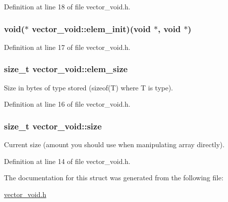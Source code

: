 \-Definition at line 18 of file vector\-\_\-void.\-h.

\hypertarget{structvector__void_af5d27d7e1af89d5dfbcf49f1810cc0c2}{
\subsubsection[{elem\-\_\-init}]{\setlength{\rightskip}{0pt plus 5cm}void($\ast$ {\bf vector\-\_\-void\-::elem\-\_\-init})(void $\ast$, void $\ast$)}}\label{structvector__void_af5d27d7e1af89d5dfbcf49f1810cc0c2}


\-Definition at line 17 of file vector\-\_\-void.\-h.

\hypertarget{structvector__void_afedda26ce85492462b79dae9090c49f6}{
\subsubsection[{elem\-\_\-size}]{\setlength{\rightskip}{0pt plus 5cm}size\-\_\-t {\bf vector\-\_\-void\-::elem\-\_\-size}}}\label{structvector__void_afedda26ce85492462b79dae9090c49f6}


\-Size in bytes of type stored (sizeof(\-T) where \-T is type). 



\-Definition at line 16 of file vector\-\_\-void.\-h.

\hypertarget{structvector__void_a94e09482f6122993461724a988ae6f92}{
\subsubsection[{size}]{\setlength{\rightskip}{0pt plus 5cm}size\-\_\-t {\bf vector\-\_\-void\-::size}}}\label{structvector__void_a94e09482f6122993461724a988ae6f92}


\-Current size (amount you should use when manipulating array directly). 



\-Definition at line 14 of file vector\-\_\-void.\-h.



\-The documentation for this struct was generated from the following file\-:\begin{DoxyCompactItemize}
\item 
\hyperlink{vector__void_8h}{vector\-\_\-void.\-h}\end{DoxyCompactItemize}
